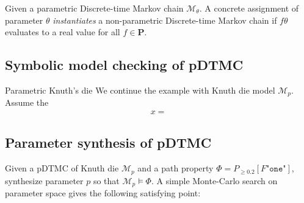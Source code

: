Given a parametric Discrete-time Markov chain $\mathcal{M}_\theta$. A concrete assignment of parameter $\theta$
\textit{instantiates} a non-parametric Discrete-time Markov chain if $f{\theta}$ evaluates to a
real value for all $f\in\mathbf{P}$.

\subsection{Symbolic model checking of pDTMC}

\begin{example}{Parametric Knuth's die}
    We continue the example with Knuth die model $\mathcal{M}_{p}$. Assume the
    \begin{align*}
        x =
    \end{align*}
\end{example}

\subsection{Parameter synthesis of pDTMC}

\begin{example}
    Given a pDTMC of Knuth die $\mathcal{M}_{p}$ and a path property $\Phi = P_{\geq 0.2} [F
                \texttt{"one"}]$, synthesize parameter $p$ so that $\mathcal{M}_{p} \models \Phi$. A simple
    Monte-Carlo search on parameter space gives the following satisfying point:
\end{example}

